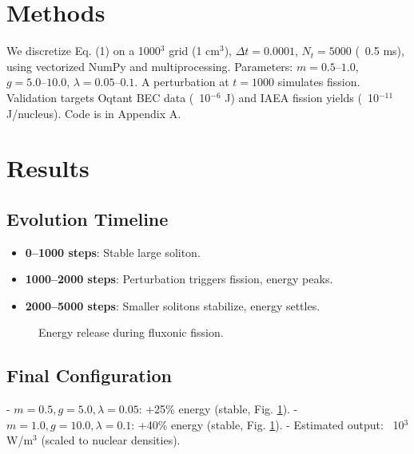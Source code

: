\documentclass[11pt]{article}
\begin{document}
\section{Methods}
We discretize Eq. (1) on a 1000$^3$ grid (1 cm$^3$), \(\Delta t = 0.0001\), \(N_t = 5000\) (~0.5 ms), using vectorized NumPy and multiprocessing. Parameters: \(m = 0.5–1.0\), \(g = 5.0–10.0\), \(\lambda = 0.05–0.1\). A perturbation at \(t = 1000\) simulates fission. Validation targets Oqtant BEC data (~10$^{-6}$ J) and IAEA fission yields (~10$^{-11}$ J/nucleus). Code is in Appendix A.

\section{Results}
\subsection{Evolution Timeline}
\begin{itemize}
    \item \textbf{0--1000 steps}: Stable large soliton.
    \item \textbf{1000--2000 steps}: Perturbation triggers fission, energy peaks.
    \item \textbf{2000--5000 steps}: Smaller solitons stabilize, energy settles.
\end{itemize}

\begin{figure}[h]
    \centering
    \caption{Energy release during fluxonic fission.}
    \label{fig:nuclear_energy}
\end{figure}

\subsection{Final Configuration}
- \(m=0.5, g=5.0, \lambda=0.05\): +25\% energy (stable, Fig. \ref{fig:nuclear_energy}).
- \(m=1.0, g=10.0, \lambda=0.1\): +40\% energy (stable, Fig. \ref{fig:nuclear_energy}).
- Estimated output: ~10$^3$ W/m$^3$ (scaled to nuclear densities).
\end{document}
